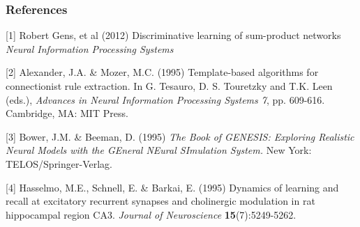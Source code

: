 \documentclass{article} %
\begin{document}
\subsubsection*{References}

\small{
    [1] Robert Gens, et al (2012) Discriminative learning of sum-product networks {\it Neural Information Processing Systems}

[2] Alexander, J.A. \& Mozer, M.C. (1995) Template-based algorithms
for connectionist rule extraction. In G. Tesauro, D. S. Touretzky
and T.K. Leen (eds.), {\it Advances in Neural Information Processing
Systems 7}, pp. 609-616. Cambridge, MA: MIT Press.

[3] Bower, J.M. \& Beeman, D. (1995) {\it The Book of GENESIS: Exploring
Realistic Neural Models with the GEneral NEural SImulation System.}
New York: TELOS/Springer-Verlag.

[4] Hasselmo, M.E., Schnell, E. \& Barkai, E. (1995) Dynamics of learning
and recall at excitatory recurrent synapses and cholinergic modulation
in rat hippocampal region CA3. {\it Journal of Neuroscience}
{\bf 15}(7):5249-5262.
}
\end{document}

